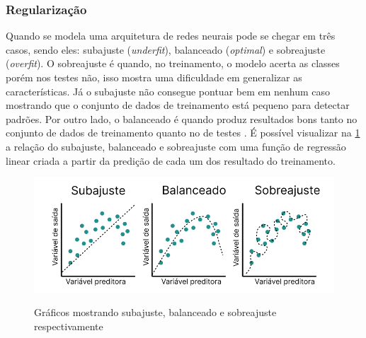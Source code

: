 \subsubsection*{Regularização}

Quando se modela uma arquitetura de redes neurais pode se chegar em três casos, sendo eles: subajuste (\textit{underfit}), balanceado (\textit{optimal}) e sobreajuste (\textit{overfit}). O sobreajuste é quando, no treinamento, o modelo acerta as classes porém nos testes não, isso mostra uma dificuldade em generalizar as características. Já o subajuste não consegue pontuar bem em nenhum caso mostrando que o conjunto de dados de treinamento está pequeno para detectar padrões. Por outro lado,  o balanceado é quando produz resultados bons tanto no conjunto de dados de treinamento quanto no de testes \space\cite{Alzubaidi2021, computation11030052}. É possível visualizar na \cref{fig:fittings} a relação do subajuste, balanceado e sobreajuste com uma função de regressão linear criada a partir da predição de cada um dos resultado do treinamento.

\begin{figure}[ht]
	\caption{Gráficos mostrando subajuste, balanceado e sobreajuste respectivamente}
	\centering %
	\includegraphics[width=15cm]{figures/fittings.png} %
	\label{fig:fittings}
\end{figure}
